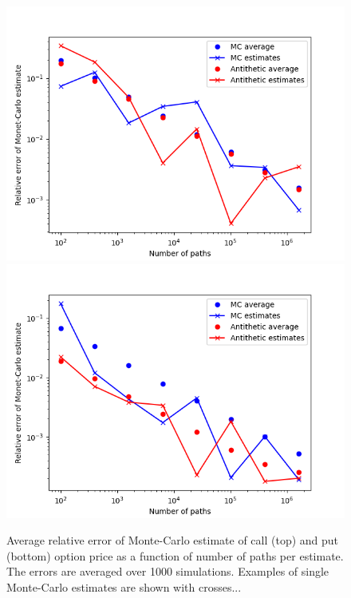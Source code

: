 \begin{figure}
\centering
\includegraphics[scale=0.7]{figures/hw_1f_call_option/mc_error_Call.png}
\includegraphics[scale=0.7]{figures/hw_1f_put_option/mc_error_Put.png}
\caption{Average relative error of Monte-Carlo estimate of call (top) and put (bottom) option price as a function of number of paths per estimate. The errors are averaged over 1000 simulations. Examples of single Monte-Carlo estimates are shown with crosses...}
\end{figure}

